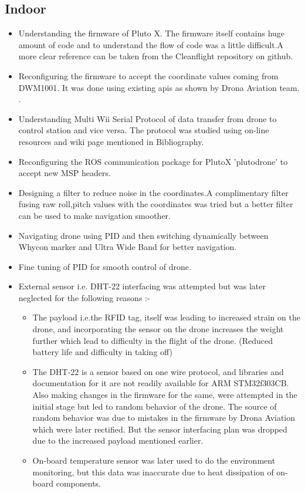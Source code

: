 \documentclass[a4paper,12pt,oneside]{book}
\begin{document}
\subsection{Indoor}
\begin{itemize}
\item Understanding the firmware of Pluto X. The firmware itself contains huge amount of code and to understand the flow of code was a little difficult.A more clear reference can be taken from the Cleanflight repository on github.
\item Reconfiguring the firmware to accept the coordinate values coming from DWM1001. It was done using existing apis as shown by Drona Aviation team. .
\item Understanding Multi Wii Serial Protocol of data transfer from drone to control station and vice versa. The protocol was studied using on-line resources and wiki page mentioned in Bibliography.
\item Reconfiguring the ROS communication package for PlutoX 'plutodrone' to accept new MSP headers.
\item Designing a filter to reduce noise in the coordinates.A complimentary filter fusing raw roll,pitch values with the coordinates was tried but a better filter can be used to make navigation smoother.
\item Navigating drone using PID and then switching dynamically between Whycon marker and Ultra Wide Band for better navigation.
\item Fine tuning of PID for smooth control of drone.
\item External sensor i.e. DHT-22 interfacing was attempted but was later neglected for the following reasons :-
\begin{itemize}
\item The payload i.e.the RFID tag, itself was leading to increased strain on the drone, and incorporating the sensor on the drone increases the weight further which lead to difficulty in the flight of the drone. (Reduced battery life and difficulty in taking off)
\item The DHT-22 is a sensor based on one wire protocol, and libraries and documentation for it are not readily available for ARM STM32f303CB. Also making changes in the firmware for the same, were attempted in the initial stage but led to random behavior of the drone. The source of random behavior was due to mistakes in the firmware by Drona Aviation which were later rectified. But the sensor interfacing plan was dropped due to the increased payload mentioned earlier.
\item On-board temperature sensor was later used to do the environment monitoring, but this data was inaccurate due to heat dissipation of on-board components. 
\end{itemize}
\end{itemize}
\end{document}
